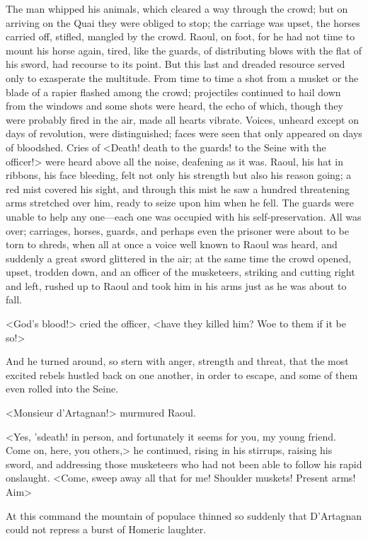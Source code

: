 The man whipped his animals, which cleared a way through the crowd; but on arriving on the Quai they were obliged to stop; the carriage was upset, the horses carried off, stifled, mangled by the crowd. Raoul, on foot, for he had not time to mount his horse again, tired, like the guards, of distributing blows with the flat of his sword, had recourse to its point. But this last and dreaded resource served only to exasperate the multitude. From time to time a shot from a musket or the blade of a rapier flashed among the crowd; projectiles continued to hail down from the windows and some shots were heard, the echo of which, though they were probably fired in the air, made all hearts vibrate. Voices, unheard except on days of revolution, were distinguished; faces were seen that only appeared on days of bloodshed. Cries of <Death! death to the guards! to the Seine with the officer!> were heard above all the noise, deafening as it was. Raoul, his hat in ribbons, his face bleeding, felt not only his strength but also his reason going; a red mist covered his sight, and through this mist he saw a hundred threatening arms stretched over him, ready to seize upon him when he fell. The guards were unable to help any one—each one was occupied with his self-preservation. All was over; carriages, horses, guards, and perhaps even the prisoner were about to be torn to shreds, when all at once a voice well known to Raoul was heard, and suddenly a great sword glittered in the air; at the same time the crowd opened, upset, trodden down, and an officer of the musketeers, striking and cutting right and left, rushed up to Raoul and took him in his arms just as he was about to fall.

<God's blood!> cried the officer, <have they killed him? Woe to them if it be so!>

And he turned around, so stern with anger, strength and threat, that the most excited rebels hustled back on one another, in order to escape, and some of them even rolled into the Seine.

<Monsieur d'Artagnan!> murmured Raoul.

<Yes, 'sdeath! in person, and fortunately it seems for you, my young friend. Come on, here, you others,> he continued, rising in his stirrups, raising his sword, and addressing those musketeers who had not been able to follow his rapid onslaught. <Come, sweep away all that for me! Shoulder muskets! Present arms! Aim\longdash>

At this command the mountain of populace thinned so suddenly that D'Artagnan could not repress a burst of Homeric laughter.


